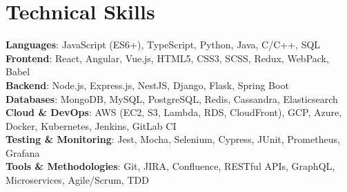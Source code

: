 \documentclass[letterpaper,10.5pt]{article}
\begin{document}
\section{Technical Skills}
\begin{itemize}[leftmargin=0.15in, label={}]
    \small{\item{
          \textbf{Languages}: JavaScript (ES6+), TypeScript, Python, Java, C/C++, SQL \\
          \textbf{Frontend}: React, Angular, Vue.js, HTML5, CSS3, SCSS, Redux, WebPack, Babel \\
          \textbf{Backend}: Node.js, Express.js, NestJS, Django, Flask, Spring Boot \\
          \textbf{Databases}: MongoDB, MySQL, PostgreSQL, Redis, Cassandra, Elasticsearch \\
          \textbf{Cloud \& DevOps}: AWS (EC2, S3, Lambda, RDS, CloudFront), GCP, Azure, Docker, Kubernetes, Jenkins, GitLab CI \\
          \textbf{Testing \& Monitoring}: Jest, Mocha, Selenium, Cypress, JUnit, Prometheus, Grafana \\
          \textbf{Tools \& Methodologies}: Git, JIRA, Confluence, RESTful APIs, GraphQL, Microservices, Agile/Scrum, TDD
          }}
\end{itemize}
\end{document}
